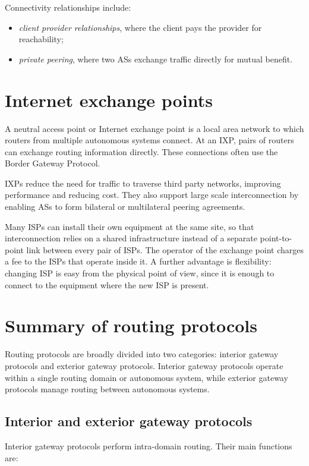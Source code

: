 Connectivity relationships include:

\begin{itemize}
\item \emph{client provider relationships}, where the client pays the provider for reachability;
\item \emph{private peering}, where two ASs exchange traffic directly for mutual benefit.
\end{itemize}

\section{Internet exchange points}

A neutral access point or Internet exchange point is a local area network to which routers from multiple autonomous systems connect. At an IXP, pairs of routers can exchange routing information directly. These connections often use the Border Gateway Protocol.

IXPs reduce the need for traffic to traverse third party networks, improving performance and reducing cost. They also support large scale interconnection by enabling ASs to form bilateral or multilateral peering agreements.

Many ISPs can install their own equipment at the same site, so that
interconnection relies on a shared infrastructure instead of a separate
point-to-point link between every pair of ISPs. The operator of the exchange
point charges a fee to the ISPs that operate inside it. A further advantage is
flexibility: changing ISP is easy from the physical point of view, since it is
enough to connect to the equipment where the new ISP is present.

\section{Summary of routing protocols}

Routing protocols are broadly divided into two categories: interior gateway protocols and exterior gateway protocols. Interior gateway protocols operate within a single routing domain or autonomous system, while exterior gateway protocols manage routing between autonomous systems.

\subsection{Interior and exterior gateway protocols}

Interior gateway protocols perform intra-domain routing. Their main functions are:

